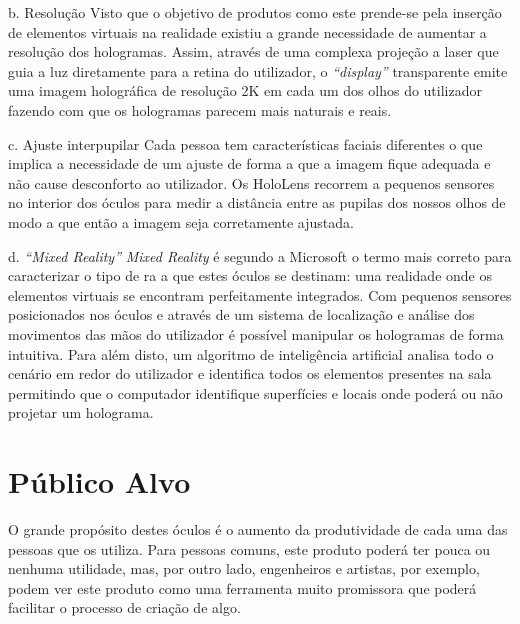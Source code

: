 \documentclass{report}
\begin{document}
b. Resolução
Visto que o objetivo de produtos como este prende-se pela inserção de elementos virtuais na realidade existiu a grande necessidade de aumentar a resolução dos hologramas. Assim, através de uma complexa projeção a laser que guia a luz diretamente para a retina do utilizador, o \textit{“display”} transparente emite uma imagem holográfica de resolução 2K em cada um dos olhos do utilizador fazendo com que os hologramas parecem mais naturais e reais.

c. Ajuste interpupilar
Cada pessoa tem características faciais diferentes o que implica a necessidade de um ajuste de forma a que a imagem fique adequada e não cause desconforto ao utilizador. Os HoloLens recorrem a pequenos sensores no interior dos óculos para medir a distância entre as pupilas dos nossos olhos de modo a que então a imagem seja corretamente ajustada.

d. \textit{“Mixed Reality”}
\textit{Mixed Reality} é segundo a Microsoft o termo mais correto para caracterizar o tipo de \ac{ra} a que estes óculos se destinam: uma realidade onde os elementos virtuais se encontram perfeitamente integrados. Com pequenos sensores posicionados nos óculos e através de um sistema de localização e análise dos movimentos das mãos do utilizador é possível manipular os hologramas de forma intuitiva. Para além disto, um algoritmo de inteligência artificial analisa todo o cenário em redor do utilizador e identifica todos os elementos presentes na sala permitindo que o computador identifique superfícies e locais onde poderá ou não projetar um holograma.


\section{Público Alvo}
O grande propósito destes óculos é o aumento da produtividade de cada uma das pessoas que os utiliza.
Para pessoas comuns, este produto poderá ter pouca ou nenhuma utilidade, mas, por outro lado, engenheiros e artistas, por exemplo, podem ver este produto como uma ferramenta muito promissora que poderá facilitar o processo de criação de algo.

\end{document}
